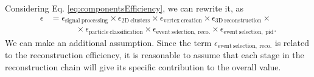 Considering Eq. \eqref{eq:componentsEfficiency}, we can rewrite it, as \begin{equation}
    \begin{aligned}
        \epsilon &= 
        \epsilon_\mathrm{signal\ processing} \times 
        \epsilon_\mathrm{2D\ clusters} \times 
        \epsilon_\mathrm{vertex\ creation} \times 
        \epsilon_\mathrm{3D\ reconstruction} \times \\
        &\quad\quad\quad\times
        \epsilon_\mathrm{particle\ classification} \times 
        \epsilon_\mathrm{event\ selection,\ reco.} \times 
        \epsilon_\mathrm{event\ selection,\ pid}.
    \end{aligned} \label{eq:componentsEfficiencyPid}
\end{equation} We can make an additional assumption.
Since the term $\epsilon_\mathrm{event\ selection,\ reco.}$ is related to the reconstruction efficiency, it is reasonable to assume that each stage in the reconstruction chain will give its specific contribution to the overall value.
